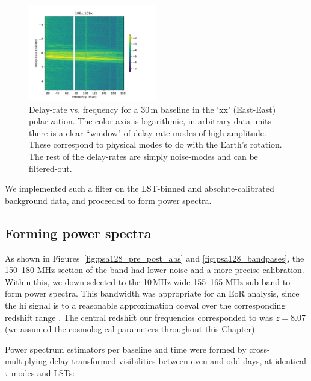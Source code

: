 \begin{figure}
\centering
\includegraphics[width=0.5\textwidth]{chapters/psa128_pol/figures/fringerate_example.pdf}
\caption[Delay-rate vs. frequency for a 30\,m baseline in the `xx' (East-East) polarization.]{Delay-rate vs. frequency for a 30\,m baseline in the `xx' (East-East) polarization. The color axis is logarithmic, in arbitrary data units -- there is a clear ``window" of delay-rate modes of high amplitude. These correspond to physical modes to do with the Earth's rotation. The rest of the delay-rates are simply noise-modes and can be filtered-out.}
\label{fig:fringerate_example}
\end{figure}

We implemented such a filter on the LST-binned and absolute-calibrated background data, and proceeded to form power spectra.

\subsection{Forming power spectra}

As shown in Figures~\ref{fig:psa128_pre_post_abs} and \ref{fig:psa128_bandpases}, the 150--180 MHz section of the band had lower noise and a more precise calibration. Within this, we down-selected to the 10\,MHz-wide 155--165 MHz sub-band to form power spectra. This bandwidth was appropriate for an EoR analysis, since the {\sc hi} signal is to a reasonable approximation coeval over the corresponding redshift range \citep{Furlanetto.06}. The central redshift our frequencies corresponded to was $z=8.07$ (we assumed the \cite{Planck.16} cosmological parameters throughout this Chapter).

Power spectrum estimators per baseline and time were formed by cross-multiplying delay-transformed visibilities between even and odd days, at identical $\tau$ modes and LSTs:

